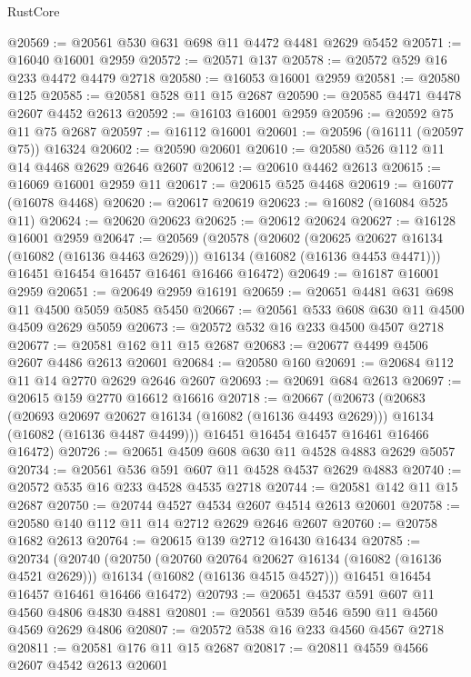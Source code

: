 \begin{lexlean}{RustCore}
\begin{coremodule}
@20569 := @20561 @530 @631 @698 @11 @4472 @4481 @2629 @5452
@20571 := @16040 @16001 @2959
@20572 := @20571 @137
@20578 := @20572 @529 @16 @233 @4472 @4479 @2718
@20580 := @16053 @16001 @2959
@20581 := @20580 @125
@20585 := @20581 @528 @11 @15 @2687
@20590 := @20585 @4471 @4478 @2607 @4452 @2613
@20592 := @16103 @16001 @2959
@20596 := @20592 @75 @11 @75 @2687
@20597 := @16112 @16001
@20601 := @20596 (@16111 (@20597 @75)) @16324
@20602 := @20590 @20601
@20610 := @20580 @526 @112 @11 @14 @4468 @2629 @2646 @2607
@20612 := @20610 @4462 @2613
@20615 := @16069 @16001 @2959 @11
@20617 := @20615 @525 @4468
@20619 := @16077 (@16078 @4468)
@20620 := @20617 @20619
@20623 := @16082 (@16084 @525 @11)
@20624 := @20620 @20623
@20625 := @20612 @20624
@20627 := @16128 @16001 @2959
@20647 := @20569
    (@20578
      (@20602
        (@20625 @20627 @16134 (@16082 (@16136 @4463 @2629)))
        @16134
        (@16082 (@16136 @4453 @4471)))
      @16451
      @16454
      @16457
      @16461
      @16466
      @16472)
@20649 := @16187 @16001 @2959
@20651 := @20649 @2959 @16191
@20659 := @20651 @4481 @631 @698 @11 @4500 @5059 @5085 @5450
@20667 := @20561 @533 @608 @630 @11 @4500 @4509 @2629 @5059
@20673 := @20572 @532 @16 @233 @4500 @4507 @2718
@20677 := @20581 @162 @11 @15 @2687
@20683 := @20677 @4499 @4506 @2607 @4486 @2613 @20601
@20684 := @20580 @160
@20691 := @20684 @112 @11 @14 @2770 @2629 @2646 @2607
@20693 := @20691 @684 @2613
@20697 := @20615 @159 @2770 @16612 @16616
@20718 := @20667
    (@20673
      (@20683
        (@20693 @20697 @20627 @16134 (@16082 (@16136 @4493 @2629)))
        @16134
        (@16082 (@16136 @4487 @4499)))
      @16451
      @16454
      @16457
      @16461
      @16466
      @16472)
@20726 := @20651 @4509 @608 @630 @11 @4528 @4883 @2629 @5057
@20734 := @20561 @536 @591 @607 @11 @4528 @4537 @2629 @4883
@20740 := @20572 @535 @16 @233 @4528 @4535 @2718
@20744 := @20581 @142 @11 @15 @2687
@20750 := @20744 @4527 @4534 @2607 @4514 @2613 @20601
@20758 := @20580 @140 @112 @11 @14 @2712 @2629 @2646 @2607
@20760 := @20758 @1682 @2613
@20764 := @20615 @139 @2712 @16430 @16434
@20785 := @20734
    (@20740
      (@20750
        (@20760 @20764 @20627 @16134 (@16082 (@16136 @4521 @2629)))
        @16134
        (@16082 (@16136 @4515 @4527)))
      @16451
      @16454
      @16457
      @16461
      @16466
      @16472)
@20793 := @20651 @4537 @591 @607 @11 @4560 @4806 @4830 @4881
@20801 := @20561 @539 @546 @590 @11 @4560 @4569 @2629 @4806
@20807 := @20572 @538 @16 @233 @4560 @4567 @2718
@20811 := @20581 @176 @11 @15 @2687
@20817 := @20811 @4559 @4566 @2607 @4542 @2613 @20601

\end{coremodule}
\end{lexlean}
